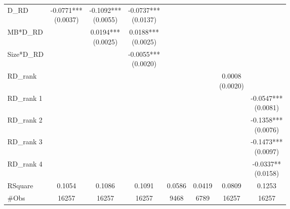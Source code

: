 \documentclass{article}
\begin{document}
\begin{table}[h!]
\begin{tabular}{lccccccc}
        D\_RD      & \makecell{-0.0771***                                                                                                          \\ (0.0037)} & \makecell{-0.1092*** \\ (0.0055)} & \makecell{-0.0737*** \\ (0.0137)} & & & \\
        MB*D\_RD   &                      & \makecell{0.0194***                                                                                    \\ (0.0025)} & \makecell{0.0188*** \\ (0.0025)} & & & \\
        Size*D\_RD &                      &                     & \makecell{-0.0055***                                                             \\ (0.0020)} & & & \\
        RD\_rank   &                      &                     &                      &        &        & \makecell{0.0008                        \\ (0.0020)} &  \\
        RD\_rank 1 &                      &                     &                      &        &        &                  & \makecell{-0.0547*** \\ (0.0081)} \\
        RD\_rank 2 &                      &                     &                      &        &        &                  & \makecell{-0.1358*** \\ (0.0076)} \\
        RD\_rank 3 &                      &                     &                      &        &        &                  & \makecell{-0.1473*** \\ (0.0097)} \\
        RD\_rank 4 &                      &                     &                      &        &        &                  & \makecell{-0.0337**  \\ (0.0158)} \\
        \midrule
        RSquare    & 0.1054               & 0.1086              & 0.1091               & 0.0586 & 0.0419 & 0.0809           & 0.1253               \\
        \#Obs      & 16257                & 16257               & 16257                & 9468   & 6789   & 16257            & 16257                \\
        \bottomrule

\end{tabular}
\end{table}
\end{document}
